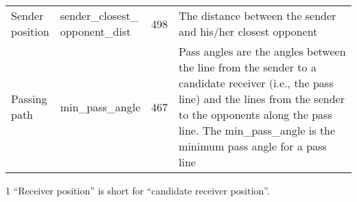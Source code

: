 \begin{table}[!t]
{\begin{threeparttable}
\begin{tabular}{llcp{6cm}}
  \specialcell{Sender\\position} & \specialcell{sender\_closest\_\\opponent\_dist} & 498 & The distance between the sender and his/her closest opponent \\
  \specialcell{Passing\\path} & min\_pass\_angle & 467 & Pass angles are the angles between the line from the sender to a candidate receiver (i.e., the pass line) and the lines from the sender to the opponents along the pass line. The min\_pass\_angle is the minimum pass angle for a pass line \\
 
  \bottomrule
\end{tabular}
\begin{tablenotes}
\item[1] ``Receiver position'' is short for ``candidate receiver position''.
\end{tablenotes}
\end{threeparttable}
}
\label{tab:top-10-feature}
\end{table}

